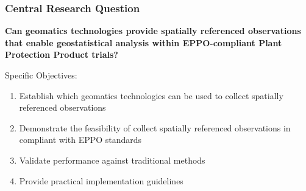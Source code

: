 \documentclass[aspectratio=43]{beamer}
\begin{document}
\begin{frame}
    \frametitle{\small Central Research Question}
    
    \begin{exampleblock}{}
        \large
        \textbf{Can geomatics technologies provide spatially referenced observations that enable geostatistical analysis within EPPO-compliant Plant Protection Product trials?}
    \end{exampleblock}
    
    \vspace{1em}
    
    \begin{block}{Specific Objectives:}
        \begin{enumerate}
            \item Establish which geomatics technologies can be used to collect spatially referenced observations
            \item Demonstrate the feasibility of collect spatially referenced observations in compliant with EPPO standards
            \item Validate performance against traditional methods
            \item Provide practical implementation guidelines
        \end{enumerate}
    \end{block}
\end{frame}
\end{document}
